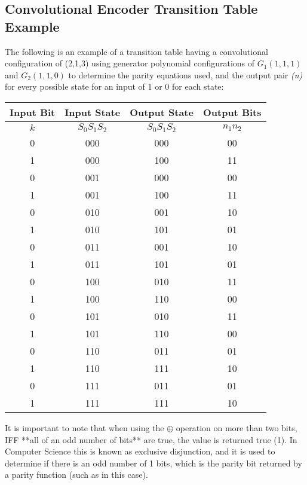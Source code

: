 \documentclass[conference]{IEEEtran}
\begin{document}
\subsection{Convolutional Encoder Transition Table Example}
The following is an example of a transition table having a convolutional configuration of (2,1,3) using generator polynomial configurations of $G_1(1,1,1)$ and $G_2(1,1,0)$ to determine the parity equations used, and the output pair \textit{(n)} for every possible state for an input of 1 or 0 for each state:
\begin{center}
\begin{tabular}{| c | c | c | c |}
 \hline
 \textbf{Input Bit} & \textbf{Input State} & \textbf{Output State} & \textbf{Output Bits} \\ 
 \hline \hline
 $k$ & $S_0 S_1 S_2$ & $S_0 S_1 S_2$ & $n_1 n_2$ \\
 \hline
 0 & 000 & 000 & 00 \\
 \hline
 1 & 000 & 100 & 11 \\
 \hline
 0 & 001 & 000 & 00 \\
 \hline
 1 & 001 & 100 & 11 \\
 \hline
 0 & 010 & 001 & 10 \\
 \hline
 1 & 010 & 101 & 01 \\
 \hline
 0 & 011 & 001 & 10 \\
 \hline
 1 & 011 & 101 & 01 \\
 \hline
 0 & 100 & 010 & 11 \\
 \hline
 1 & 100 & 110 & 00 \\
 \hline
 0 & 101 & 010 & 11 \\
 \hline
 1 & 101 & 110 & 00 \\
 \hline
 0 & 110 & 011 & 01 \\
 \hline
 1 & 110 & 111 & 10 \\
 \hline
 0 & 111 & 011 & 01 \\
 \hline
 1 & 111 & 111 & 10 \\
 \hline
\end{tabular}
\end{center}
It is important to note that when using the $\oplus$ operation on more than two bits, IFF **all of an odd number of bits** are true, the value is returned true (1). In Computer Science this is known as exclusive disjunction, and it is used to determine if there is an odd number of 1 bits, which is the parity bit returned by a parity function (such as in this case).
\end{document}
